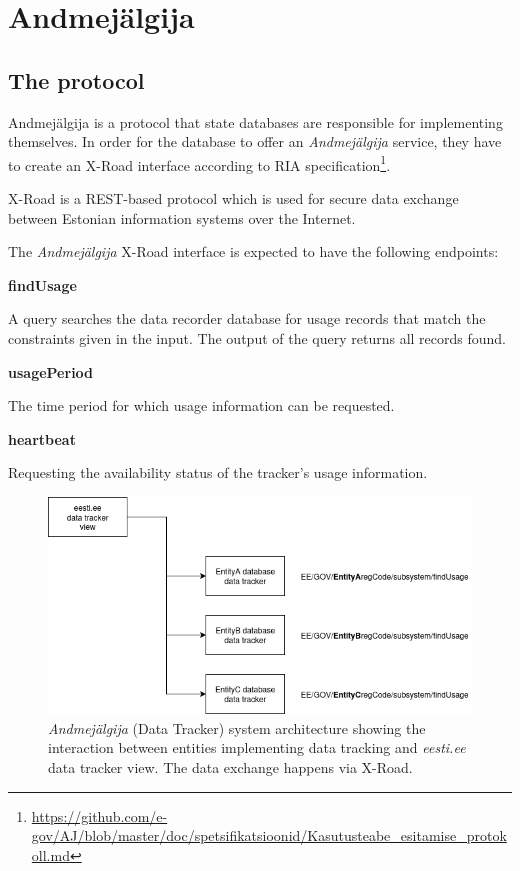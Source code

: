 \section{Andmejälgija} \label{Andmejälgija}

\subsection{The protocol} \label{protocol_desc}

Andmejälgija is a protocol that state databases are responsible for implementing themselves. In order for the database to offer an \textit{Andmejälgija} service, they have to create an X-Road interface according to RIA specification\footnote{\url{https://github.com/e-gov/AJ/blob/master/doc/spetsifikatsioonid/Kasutusteabe_esitamise_protokoll.md}}. 

X-Road is a REST-based protocol which is used for secure data exchange between Estonian information systems over the Internet.

The \textit{Andmejälgija} X-Road interface is expected to have the following endpoints:

\textbf{findUsage}

A query searches the data recorder database for usage records that match the constraints given in the input. The output of the query returns all records found.\cite{aj-github-spec}

\textbf{usagePeriod}

The time period for which usage information can be requested.\cite{aj-github-spec}

\textbf{heartbeat}

Requesting the availability status of the tracker's usage information.\cite{aj-github-spec}

\begin{figure}[H]
\centering
\includegraphics[width=450px]{english/figures/aj_model.PNG}
\caption{\textit{Andmejälgija} (Data Tracker) system architecture showing the interaction between entities implementing data tracking and \textit{eesti.ee} data tracker view. The data exchange happens via X-Road.}
\label{fig:aj-model}
\end{figure}

